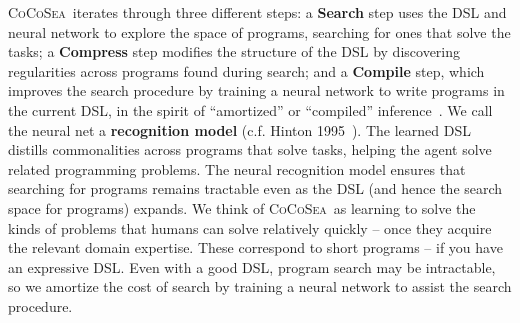 \documentclass{article}
\newcommand{\system}{\textsc{CoCoSea}~}
\newcommand{\systemEnding}{\textsc{CoCoSea}}
\begin{document}
\system iterates through three different steps: a
\textbf{Search} step uses the DSL and neural network to explore the space of programs,
searching for ones that solve the tasks; a \textbf{Compress} step
modifies the structure of the DSL by discovering regularities across programs found during search; and a \textbf{Compile} step, which
improves the search procedure by training a neural network to
write programs in the current DSL, in the spirit of ``amortized'' or
``compiled'' inference~\cite{le2016inference}.
We call the neural net a \textbf{recognition model} (c.f. Hinton 1995~\cite{hinton1995wake}).
The learned DSL
distills commonalities across programs that solve tasks, helping
the agent solve related programming problems. The neural
recognition model ensures that searching for programs remains tractable
even as the DSL (and hence the search space for programs) expands.
We think of \system as learning to solve the kinds of problems that humans
can solve relatively quickly -- once they acquire the relevant domain expertise.
These correspond to short programs -- if you have an expressive DSL.
Even with a good DSL, program search may be intractable, so
we amortize the cost of search by training a neural network to
assist the search procedure.
\end{document}
